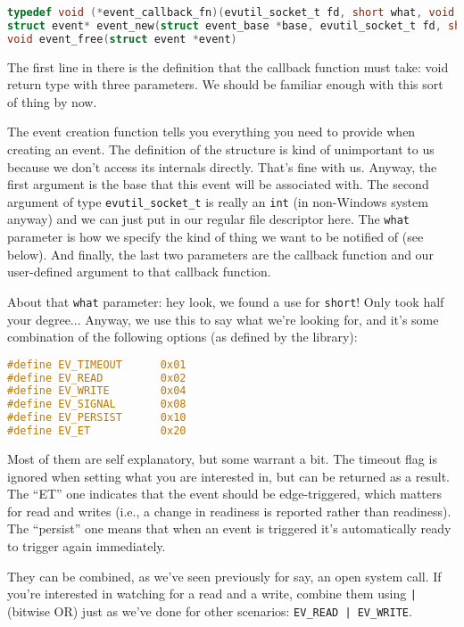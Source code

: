 \begin{lstlisting}[language=C]
typedef void (*event_callback_fn)(evutil_socket_t fd, short what, void * arg)
struct event* event_new(struct event_base *base, evutil_socket_t fd, short what, event_callback_fn cb, void *arg)
void event_free(struct event *event)
\end{lstlisting}

The first line in there is the definition that the callback function must take: void return type with three parameters. We should be familiar enough with this sort of thing by now.

The event creation function tells you everything you need to provide when creating an event. The definition of the structure is kind of unimportant to us because we don't access its internals directly. That's fine with us. Anyway, the first argument is the base that this event will be associated with. The second argument of type \texttt{evutil\_socket\_t} is really an \texttt{int} (in non-Windows system anyway) and we can just put in our regular file descriptor here. The \texttt{what} parameter is how we specify the kind of thing we want to be notified of (see below). And finally, the last two parameters are the callback function and our user-defined argument to that callback function.

About that \texttt{what} parameter: hey look, we found a use for \texttt{short}! Only took half your degree... Anyway, we use this to say what we're looking for, and it's some combination of the following options (as defined by the library):

\begin{lstlisting}[language=C]
#define EV_TIMEOUT      0x01
#define EV_READ         0x02
#define EV_WRITE        0x04
#define EV_SIGNAL       0x08
#define EV_PERSIST      0x10
#define EV_ET           0x20
\end{lstlisting}

Most of them are self explanatory, but some warrant a bit. The timeout flag is ignored when setting what you are interested in, but can be returned as a result. The ``ET'' one indicates that the event should be edge-triggered, which matters for read and writes (i.e., a change in readiness is reported rather than readiness). The ``persist'' one means that when an event is triggered it's automatically ready to trigger again immediately. 

They can be combined, as we've seen previously for say, an open system call. If you're interested in watching for a read and a write, combine them using \texttt{|} (bitwise OR) just as we've done for other scenarios: \texttt{EV\_READ | EV\_WRITE}.

